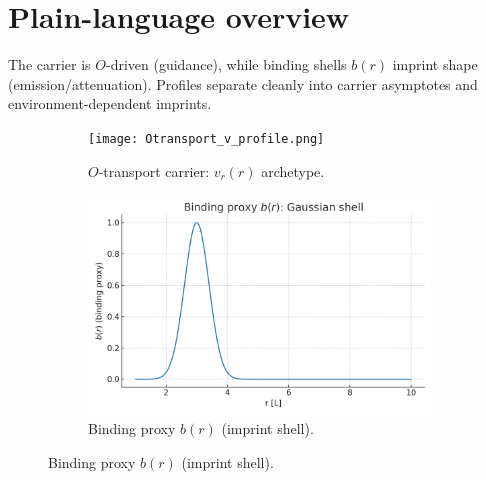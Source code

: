\documentclass[12pt,a4paper,oneside]{scrreprt}
\begin{document}
\section*{Plain-language overview}
The carrier is $O$-driven (guidance), while binding shells $b(r)$ imprint shape (emission/attenuation). Profiles separate cleanly into carrier asymptotes and environment-dependent imprints.

\begin{figure}[htbp]\centering
  \begin{subfigure}[t]{0.49\linewidth}
    \texttt{[image: Otransport\_v\_profile.png]}
    \caption{$O$-transport carrier: $v_r(r)$ archetype.}
    \label{fig:carrier:vr}
  \end{subfigure}\hfill
  \begin{subfigure}[t]{0.49\linewidth}
    \includegraphics[width=\linewidth]{binding_proxy_shell.png}
    \caption{Binding proxy $b(r)$ (imprint shell).}
    \label{fig:carrier:b}
  \end{subfigure}


\end{figure}
\end{document}
